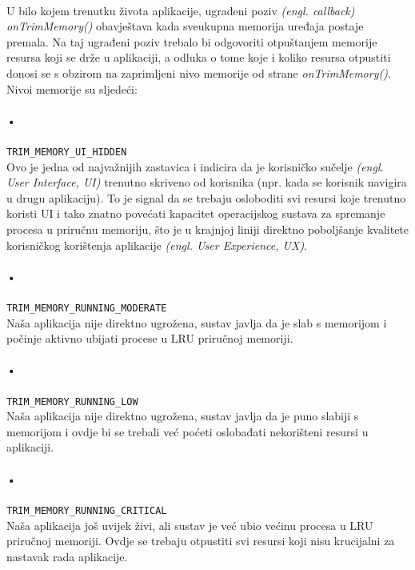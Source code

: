 \documentclass[times, utf8, zavrsni]{fer}
\begin{document}
\paragraph{}
U bilo kojem trenutku života aplikacije, ugrađeni poziv \textit{(engl. callback)} \textit{onTrimMemory()} obavještava kada sveukupna memorija uređaja postaje premala. Na taj ugrađeni poziv trebalo bi odgovoriti otpuštanjem memorije resursa koji se drže u aplikaciji, a odluka o tome koje i koliko resursa otpustiti donosi se s obzirom na zaprimljeni nivo memorije od strane \textit{onTrimMemory()}. Nivoi memorije su sljedeći:

\paragraph{•}
\verb|TRIM_MEMORY_UI_HIDDEN|\\
Ovo je jedna od najvažnijih zastavica i indicira da je korisničko sučelje \textit{(engl. User Interface, UI)} trenutno skriveno od korisnika (npr. kada se korisnik navigira u drugu aplikaciju). To je signal da se trebaju osloboditi svi resursi koje trenutno koristi UI i tako znatno povećati kapacitet operacijskog sustava za spremanje procesa u priručnu memoriju, što je u krajnjoj liniji direktno poboljšanje kvalitete korisničkog korištenja aplikacije \textit{(engl. User Experience, UX)}.

\paragraph{•}
\verb|TRIM_MEMORY_RUNNING_MODERATE|\\
Naša aplikacija nije direktno ugrožena, sustav javlja da je slab s memorijom i počinje aktivno ubijati procese u LRU priručnoj memoriji.

\paragraph{•}
\verb|TRIM_MEMORY_RUNNING_LOW|\\
Naša aplikacija nije direktno ugrožena, sustav javlja da je puno slabiji s memorijom i ovdje bi se trebali već poćeti oslobađati nekorišteni resursi u aplikaciji.

\paragraph{•}
\verb|TRIM_MEMORY_RUNNING_CRITICAL|\\
Naša aplikacija još uvijek živi, ali sustav je već ubio većinu procesa u LRU priručnoj memoriji. Ovdje se trebaju otpustiti svi resursi koji nisu krucijalni za nastavak rada aplikacije.\\
\end{document}
